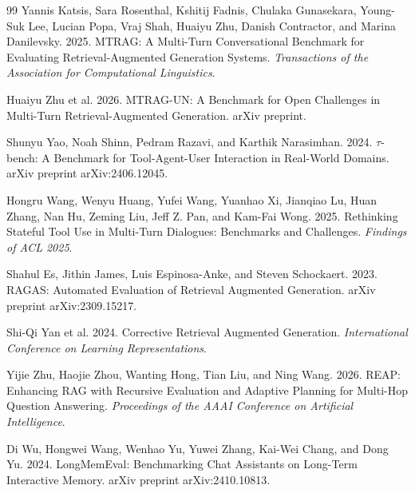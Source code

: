 \documentclass[letterpaper]{article}
\begin{document}
\begin{thebibliography}{99}
Yannis Katsis, Sara Rosenthal, Kshitij Fadnis, Chulaka Gunasekara, Young-Suk Lee, Lucian Popa, Vraj Shah, Huaiyu Zhu, Danish Contractor, and Marina Danilevsky. 2025.
\newblock MTRAG: A Multi-Turn Conversational Benchmark for Evaluating Retrieval-Augmented Generation Systems.
\newblock \emph{Transactions of the Association for Computational Linguistics}.

Huaiyu Zhu et al. 2026.
\newblock MTRAG-UN: A Benchmark for Open Challenges in Multi-Turn Retrieval-Augmented Generation.
\newblock arXiv preprint.

Shunyu Yao, Noah Shinn, Pedram Razavi, and Karthik Narasimhan. 2024.
\newblock $\tau$-bench: A Benchmark for Tool-Agent-User Interaction in Real-World Domains.
\newblock arXiv preprint arXiv:2406.12045.

Hongru Wang, Wenyu Huang, Yufei Wang, Yuanhao Xi, Jianqiao Lu, Huan Zhang, Nan Hu, Zeming Liu, Jeff Z. Pan, and Kam-Fai Wong. 2025.
\newblock Rethinking Stateful Tool Use in Multi-Turn Dialogues: Benchmarks and Challenges.
\newblock \emph{Findings of ACL 2025}.

Shahul Es, Jithin James, Luis Espinosa-Anke, and Steven Schockaert. 2023.
\newblock RAGAS: Automated Evaluation of Retrieval Augmented Generation.
\newblock arXiv preprint arXiv:2309.15217.

Shi-Qi Yan et al. 2024.
\newblock Corrective Retrieval Augmented Generation.
\newblock \emph{International Conference on Learning Representations}.

Yijie Zhu, Haojie Zhou, Wanting Hong, Tian Liu, and Ning Wang. 2026.
\newblock REAP: Enhancing RAG with Recursive Evaluation and Adaptive Planning for Multi-Hop Question Answering.
\newblock \emph{Proceedings of the AAAI Conference on Artificial Intelligence}.

Di Wu, Hongwei Wang, Wenhao Yu, Yuwei Zhang, Kai-Wei Chang, and Dong Yu. 2024.
\newblock LongMemEval: Benchmarking Chat Assistants on Long-Term Interactive Memory.
\newblock arXiv preprint arXiv:2410.10813.
\end{thebibliography}
\end{document}
